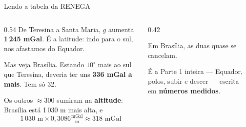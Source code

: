 \documentclass[aspectratio=169,11pt]{beamer}
\newcommand{\bnum}[1]{\textbf{\textcolor{mTeal}{#1}}}
\begin{document}
\begin{frame}{Lendo a tabela da RENEGA}
  \begin{columns}[T]
    \begin{column}{0.54\textwidth}
      De Teresina a Santa Maria, $g$ aumenta \bnum{1\,245 mGal}. É a latitude: indo para o
      sul, nos afastamos do Equador.
      \medskip

      Mas veja Brasília. Estando $10^{\circ}$ mais ao sul que Teresina, deveria ter uns
      \bnum{336 mGal a mais}. Tem só \alert{32}.
      \medskip

      Os outros $\approx 300$ sumiram na \bnum{altitude}: Brasília está 1\,030 m mais alta, e
      \[ 1\,030 \text{ m} \times 0{,}3086 \tfrac{\text{mGal}}{\text{m}} \approx 318 \text{ mGal} \]
    \end{column}
    \begin{column}{0.42\textwidth}
      \begin{ideia}[title={Latitude soma, altitude tira}]
        Em Brasília, as duas quase se cancelam.
        \medskip

        É a Parte 1 inteira --- Equador, polos, subir e descer --- escrita em
        \bnum{números medidos}.
      \end{ideia}
    \end{column}
  \end{columns}
\end{frame}
\end{document}

